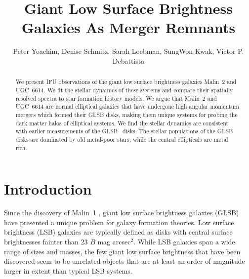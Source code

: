 \documentclass{emulateapj}
\newcommand\HI{\ion{H}{1}}
\begin{document}
\title{Giant Low Surface Brightness Galaxies As Merger Remnants}


\author{Peter Yoachim, Denise Schmitz, Sarah Loebman, SungWon Kwak, Victor P. Debattista
  }


\begin{abstract}
We present IFU observations of the giant low surface brightness galaxies Malin~2 and UGC~6614.  We fit the stellar dynamics of these systems and compare their spatially resolved spectra to star formation history models.  We argue that Malin~2 and UGC~6614 are normal elliptical galaxies that have undergone high angular momentum mergers which formed their GLSB disks, making them unique systems for probing the dark matter halos of elliptical systems.  We find the stellar dynamics are consistent with earlier measurements of the GLSB \HI\ disks.  The stellar populations of the GLSB disks are dominated by old metal-poor stars, while the central ellipticals are metal rich.

\end{abstract}


\section{Introduction}

Since the discovery of Malin~1 \citep{Bothun87}, giant low surface brightness galaxies (GLSB) have presented a unique problem for galaxy formation theories.  Low surface brightness (LSB) galaxies are typically defined as disks with central surface brightnesses fainter than 23 $B$ mag arcsec$^2$.  While LSB galaxies span a wide range of sizes and masses, the few giant low surface brightness that have been discovered seem to be unrelated objects that are at least an order of magnitude larger in extent than typical LSB systems. 
\end{document}
